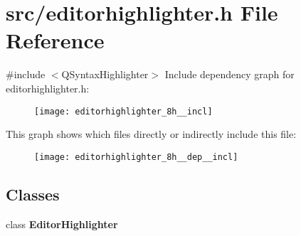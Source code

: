 \section{src/editorhighlighter.h File Reference}
\label{editorhighlighter_8h}
{\ttfamily \#include $<$Q\+Syntax\+Highlighter$>$}\newline
Include dependency graph for editorhighlighter.\+h\+:\nopagebreak
\begin{figure}[H]
\begin{center}
\leavevmode
\texttt{[image: editorhighlighter\_8h\_\_incl]}
\end{center}
\end{figure}
This graph shows which files directly or indirectly include this file\+:\nopagebreak
\begin{figure}[H]
\begin{center}
\leavevmode
\texttt{[image: editorhighlighter\_8h\_\_dep\_\_incl]}
\end{center}
\end{figure}
\subsection*{Classes}
\begin{DoxyCompactItemize}
\item 
class \textbf{ Editor\+Highlighter}
\end{DoxyCompactItemize}

